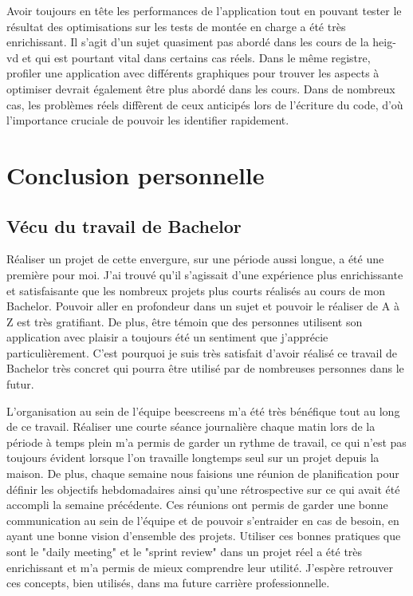 Avoir toujours en tête les performances de l'application tout en pouvant tester le résultat des optimisations sur les tests de montée en charge a été très enrichissant. Il s'agit d'un sujet quasiment pas abordé dans les cours de la \gls{heig-vd} et qui est pourtant vital dans certains cas réels. Dans le même registre, profiler une application avec différents graphiques pour trouver les aspects à optimiser devrait également être plus abordé dans les cours. Dans de nombreux cas, les problèmes réels diffèrent de ceux anticipés lors de l'écriture du code, d'où l'importance cruciale de pouvoir les identifier rapidement.

\section{Conclusion personnelle}

\subsection{Vécu du travail de Bachelor}

Réaliser un projet de cette envergure, sur une période aussi longue, a été une première pour moi. J'ai trouvé qu'il s'agissait d'une expérience plus enrichissante et satisfaisante que les nombreux projets plus courts réalisés au cours de mon Bachelor. Pouvoir aller en profondeur dans un sujet et pouvoir le réaliser de A à Z est très gratifiant. De plus, être témoin que des personnes utilisent son application avec plaisir a toujours été un sentiment que j'apprécie particulièrement. C'est pourquoi je suis très satisfait d'avoir réalisé ce travail de Bachelor très concret qui pourra être utilisé par de nombreuses personnes dans le futur.

L'organisation au sein de l'équipe \gls{beescreens} m'a été très bénéfique tout au long de ce travail. Réaliser une courte séance journalière chaque matin lors de la période à temps plein m'a permis de garder un rythme de travail, ce qui n'est pas toujours évident lorsque l'on travaille longtemps seul sur un projet depuis la maison. De plus, chaque semaine nous faisions une réunion de planification pour définir les objectifs hebdomadaires ainsi qu'une rétrospective sur ce qui avait été accompli la semaine précédente. Ces réunions ont permis de garder une bonne communication au sein de l'équipe et de pouvoir s'entraider en cas de besoin, en ayant une bonne vision d'ensemble des projets. Utiliser ces bonnes pratiques que sont le "daily meeting" et le "sprint review" dans un projet réel a été très enrichissant et m'a permis de mieux comprendre leur utilité. J'espère retrouver ces concepts, bien utilisés, dans ma future carrière professionnelle.

